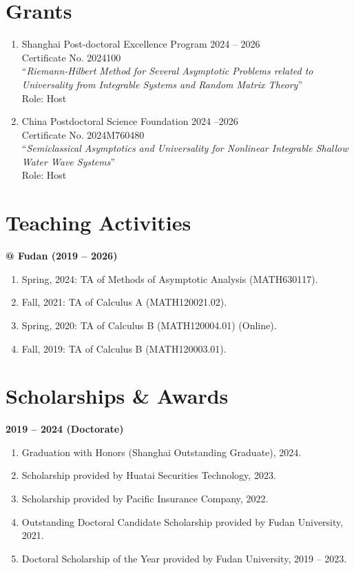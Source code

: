 \documentclass[margin]{res}
\begin{document}
\begin{resume}
\section{Grants}
\begin{enumerate}[--]
\item Shanghai Post-doctoral Excellence Program \hfill 2024 -- 2026  \\
Certificate No. 2024100\\
``{\sl Riemann-Hilbert Method for Several Asymptotic Problems related to Universality from Integrable Systems and Random Matrix Theory}''  \\
Role: Host

\item China Postdoctoral Science Foundation  \hfill 2024 --2026\\
Certificate No. 2024M760480\\
``{\sl Semiclassical Asymptotics and Universality for Nonlinear Integrable Shallow Water Wave Systems}'' \\
Role: Host
\end{enumerate}



\section{Teaching Activities}
\textbf{@ Fudan (2019 -- 2026)}
\begin{enumerate}[--]
\item Spring, 2024: TA of Methods of Asymptotic Analysis (MATH630117).
\item Fall, 2021: TA of Calculus A (MATH120021.02).
\item Spring, 2020: TA of Calculus B (MATH120004.01) (Online).
\item Fall, 2019: TA of Calculus B (MATH120003.01).
\end{enumerate}


\section{Scholarships \& Awards}
\textbf{2019 -- 2024 (Doctorate)}
\begin{enumerate}[--]
    \item Graduation with Honors (Shanghai Outstanding Graduate), 2024.
    \item Scholarship provided by Huatai Securities Technology, 2023.
    \item Scholarship provided by Pacific Insurance Company, 2022. 
    \item Outstanding Doctoral Candidate Scholarship provided by Fudan University, 2021. 
    \item Doctoral Scholarship of the Year provided by Fudan University, 2019 -- 2023. 
\end{enumerate}


\end{resume}
\end{document}
